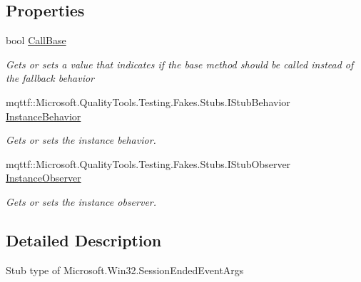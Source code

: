 \subsection*{Properties}
\begin{DoxyCompactItemize}
\item 
bool \hyperlink{class_microsoft_1_1_win32_1_1_fakes_1_1_stub_session_ended_event_args_a9665c9cf02aabad435ee648aae91c73f}{Call\-Base}
\begin{DoxyCompactList}\small\item\em Gets or sets a value that indicates if the base method should be called instead of the fallback behavior\end{DoxyCompactList}\item 
mqttf\-::\-Microsoft.\-Quality\-Tools.\-Testing.\-Fakes.\-Stubs.\-I\-Stub\-Behavior \hyperlink{class_microsoft_1_1_win32_1_1_fakes_1_1_stub_session_ended_event_args_ac964edfe3704f67db49fc87580b7b432}{Instance\-Behavior}
\begin{DoxyCompactList}\small\item\em Gets or sets the instance behavior.\end{DoxyCompactList}\item 
mqttf\-::\-Microsoft.\-Quality\-Tools.\-Testing.\-Fakes.\-Stubs.\-I\-Stub\-Observer \hyperlink{class_microsoft_1_1_win32_1_1_fakes_1_1_stub_session_ended_event_args_a207d799f0de8dd997566c1cd63732656}{Instance\-Observer}
\begin{DoxyCompactList}\small\item\em Gets or sets the instance observer.\end{DoxyCompactList}\end{DoxyCompactItemize}


\subsection{Detailed Description}
Stub type of Microsoft.\-Win32.\-Session\-Ended\-Event\-Args



